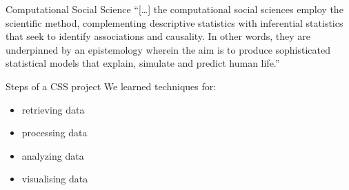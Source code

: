 \begin{frame}{Computational Social Science \parencite{Kitchin2014}}
	``[\ldots] the computational social sciences employ the scientific method, complementing descriptive statistics with inferential statistics that seek to identify associations and causality. In other words, they are underpinned by an epistemology wherein the aim is to produce sophisticated statistical models that explain, simulate and predict human life.''
\end{frame}




\begin{frame}{Steps of a CSS project}
We learned techniques for:
\begin{itemize}
\item retrieving data
\item processing data
\item analyzing data
\item visualising data
\end{itemize}
	
\end{frame}

